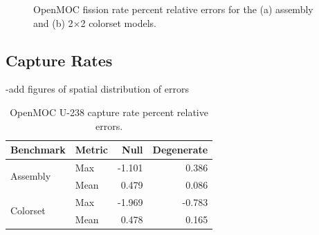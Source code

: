 \begin{figure}[h!]
\begin{subfigure}{0.35\textwidth}
  \caption{}
  \label{fig:reflector-fiss-error}
\end{subfigure}
\caption{OpenMOC fission rate percent relative errors for the (a) assembly and (b) 2$\times$2 colorset models.}
\label{fig:fiss-errors}
\end{figure}


\subsection{Capture Rates}
\label{subsec:capt-rates}

-add figures of spatial distribution of errors

\begin{table}[h!]
  \centering
  \caption{OpenMOC U-238 capture rate percent relative errors.}
  \label{tab:capt-bias} 
  \begin{tabular}{l l r r}
  \toprule
  \textbf{Benchmark} & \textbf{Metric} & \textbf{Null} & \textbf{Degenerate} \\
  \midrule
  \multirow{2}{*}{Assembly} & Max  & -1.101 &  0.386 \\
                            & Mean &  0.479 &  0.086 \\
  \midrule
  \multirow{2}{*}{Colorset} & Max  & -1.969 & -0.783 \\
                            & Mean &  0.478 &  0.165 \\
  \bottomrule
\end{tabular}
\end{table}

